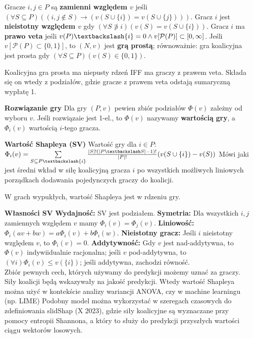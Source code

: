 
\begin{definicja}
    Gracze $i,j\in P$ są \textbf{zamienni względem $v$} jeśli $(\forall S\subseteq P)((i,j\notin S)\rightarrow(v(S\cup\{i\})=v(S\cup\{j\})))$.
    Gracz $i$ jest \textbf{nieistotny względem $v$} gdy $(\forall S\not\owns i)(v(S)=v(S\cup\{i\}))$.
    Gracz $i$ ma \textbf{prawo veta} jeśli $v(P)\textbackslash \{i\}=0 \land v[\mathcal{P}(P)]\subset[0,\infty]$.
    Jeśli $v[\mathcal{P}(P)\subset\{0,1\}]$, to $(N,v)$ jest \textbf{grą prostą}; 
    równoważnie: gra koalicyjna jest prosta gdy $(\forall S\subseteq P)(v(S)\in\{0,1\})$.
\end{definicja}
\begin{fakt}
    Koalicyjna gra prosta ma niepusty rdzeń IFF ma graczy z prawem veta. Składa się on wtedy z podziałów, gdzie gracze z prawem veta odstają sumaryczną wypłatę 1.
\end{fakt}
\begin{definicja}{\textbf{Rozwiązanie gry}}
    Dla gry $(P,v)$ pewien zbiór podziałów $\Phi(v)$ zależny od wyboru $v$. 
    Jeśli rozwiązaie jest 1-el., to $\Phi(v)$ nazywamy \textbf{wartością gry}, a $\Phi_i(v)$ wartością $i$-tego gracza.
\end{definicja}
\begin{definicja}{\textbf{Wartość Shapleya (SV)}}
    Wartość gry dla $i\in P$: $\Phi_i(v)=\sum\limits_{S\subseteq P\textbackslash\{i\}}{\frac{|S|!(|P\textbackslash S|-1)!}{|P|!}(v(S\cup\{i\})-v(S))}$
    Mówi jaki jest średni wkład w siłę koalicyjną gracza $i$ po wszystkich możliwych liniowych porządkach dodawania pojedynczych graczy do koalicji.
\end{definicja}
\begin{fakt}
    W grach wypukłych, wartość Shapleya jest w rdzeniu gry.
\end{fakt}
\begin{fakt}{\textbf{Własności SV}}
    \textbf{Wydajność:} SV jest podziałem.
    \textbf{Symetria:} Dla wszystkich $i,j$ zamiennych względem $v$ mamy $\Phi_i(v)=\Phi_j(v)$.
    \textbf{Liniowość:} $\Phi_i(av+bw)=a\Phi_i(v)+b\Phi_i(w)$.
    \textbf{Nieistotny gracz:} Jeśli $i$ nieistotny względem $v$, to $\Phi_i(v)=0$.
    \textbf{Addytywność:} Gdy $v$ jest nad-addytywna, to $\Phi(v)$ indywiidualnie racjonalna; 
    jeśli $v$ pod-addytywna, to $(\forall i) \Phi_i(v)\leq v(\{i\})$;
    jeśli addytywna, zachodzi równość. \\
    Zbiór pewnych cech, których używamy do predykcji możemy uznać za graczy. Siły koalicji będą
wskazywały na jakość predykcji. Wtedy wartość Shapleya można użyć w kontekście analizy wariancji ANOVA, czy w machine
learningu (np. LIME) Podobny model można wykorzystać w szeregach czasowych do zdefiniowania slidShap (X 2023), gdzie
siły koalicyjne są wyznaczane przy pomocy entropii Shannona, a który to służy do predykcji przyszłych wartości ciągu
wektorów losowych.
\end{fakt}
